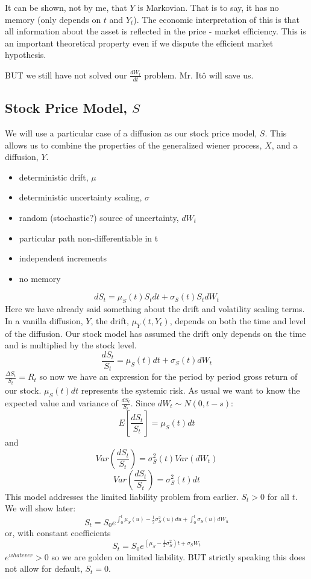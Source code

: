 \documentclass[12pt]{article}
\begin{document}
It can be shown, not by me, that $Y$ is Markovian. That is to say, it has no
memory (only depends on $t$ and $Y_t$). The economic interpretation of this is
that all information about the asset is reflected in the price - market
efficiency. This is an important theoretical property even if we dispute the
efficient market hypothesis.

BUT we still have not solved our $\frac{dW_t}{dt}$ problem. Mr. It\^o will save
us.

\subsection{Stock Price Model, $S$}
We will use a particular case of a diffusion as our stock price model, $S$. This
allows us to combine the properties of the generalized wiener process, $X$, and
a diffusion, $Y$.
\begin{itemize}
\item deterministic drift, $\mu$
\item deterministic uncertainty scaling, $\sigma$
\item random (stochastic?) source of uncertainty, $dW_t$
\item particular path non-differentiable in t
\item independent increments
\item no memory
\end{itemize}

$$dS_t=\mu_S(t)S_tdt+\sigma_S(t)S_tdW_t$$
Here we have already said something about the drift and volatility scaling
terms. In a vanilla diffusion, $Y$, the drift, $\mu_Y(t, Y_t)$, depends on both
the time and level of the diffusion. Our stock model has assumed the drift only
depends on the time and is multiplied by the stock level.
$$\frac{dS_t}{S_t}=\mu_S(t)dt+\sigma_S(t)dW_t$$
$\frac{\Delta S_t}{S_t}=R_t$ so now we have an expression for the period by
period gross return of our stock. $\mu_S(t)dt$ represents the systemic risk. As
usual we want to know the expected value and variance of $\frac{dS_t}{S_t}$.
Since $dW_t \sim N(0,t-s)$:
$$E \left[ \frac{dS_t}{S_t} \right] = \mu_S(t)dt$$
and
$$Var \left( \frac{dS_t}{S_t} \right) = \sigma_S^2(t)Var(dW_t)$$
$$Var \left( \frac{dS_t}{S_t} \right) = \sigma_S^2(t)dt$$
This model addresses the limited liability problem from earlier. $S_t>0$ for
all $t$. We will show later:
\begin{equation} \label{S}
S_t=S_0e^{\int_0^t\mu_S(u)-\frac{1}{2}\sigma_S^2(u)du+
\int_0^t\sigma_S(u)dW_u}
\end{equation}
or, with constant coefficients
\begin{equation} \label{SConsCoef}
S_t=S_0e^{(\mu_S-\frac{1}{2}\sigma_S^2)t+\sigma_SW_t}
\end{equation}
$e^{whatever} > 0$ so we are golden on limited liability. BUT strictly
speaking this does not allow for default, $S_t=0$.
\end{document}
